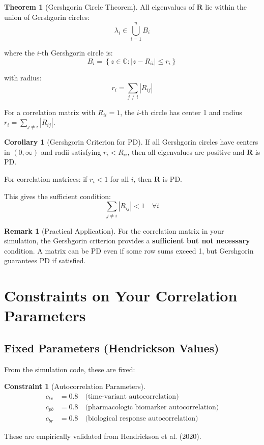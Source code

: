 \documentclass[12pt,a4paper]{article}
\theoremstyle{definition}
\newtheorem{theorem}{Theorem}
\newtheorem{corollary}{Corollary}
\newtheorem{constraint}{Constraint}
\newtheorem{remark}{Remark}
\begin{document}
\begin{theorem}[Gershgorin Circle Theorem]
\label{thm:gershgorin}
All eigenvalues of $\mathbf{R}$ lie within the union of Gershgorin circles:
\[
  \lambda_i \in \bigcup_{i=1}^n B_i
\]

where the $i$-th Gershgorin circle is:
\[
  B_i = \left\{ z \in \mathbb{C} : |z - R_{ii}| \leq r_i \right\}
\]

with radius:
\[
  r_i = \sum_{j \neq i} |R_{ij}|
\]

For a correlation matrix with $R_{ii} = 1$, the $i$-th circle has center 1 and radius $r_i = \sum_{j \neq i} |R_{ij}|$.
\end{theorem}

\begin{corollary}[Gershgorin Criterion for PD]
If all Gershgorin circles have centers in $(0, \infty)$ and radii satisfying $r_i < R_{ii}$, then all eigenvalues are positive and $\mathbf{R}$ is PD.

For correlation matrices: if $r_i < 1$ for all $i$, then $\mathbf{R}$ is PD.

This gives the sufficient condition:
\[
  \sum_{j \neq i} |R_{ij}| < 1 \quad \forall i
\]
\end{corollary}

\begin{remark}[Practical Application]
For the correlation matrix in your simulation, the Gershgorin criterion provides a \textbf{sufficient but not necessary} condition. A matrix can be PD even if some row sums exceed 1, but Gershgorin guarantees PD if satisfied.
\end{remark}

\section{Constraints on Your Correlation Parameters}

\subsection{Fixed Parameters (Hendrickson Values)}

From the simulation code, these are fixed:

\begin{constraint}[Autocorrelation Parameters]
\begin{align*}
  c_{tv} &= 0.8 \quad \text{(time-variant autocorrelation)} \\
  c_{pb} &= 0.8 \quad \text{(pharmacologic biomarker autocorrelation)} \\
  c_{br} &= 0.8 \quad \text{(biological response autocorrelation)}
\end{align*}

These are empirically validated from Hendrickson et al. (2020).
\end{constraint}
\end{document}
